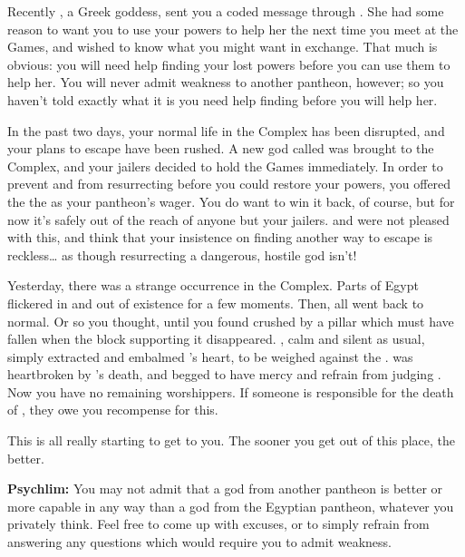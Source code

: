 \documentclass[char]{guardians}
\begin{document}
Recently \cHera{}, a Greek goddess, sent you a coded message through \cJascha{}. She had some reason to want you to use your powers to help her the next time you meet at the Games, and wished to know what you might want in exchange. That much is obvious: you will need help finding your lost powers before you can use them to help her. You will never admit weakness to another pantheon, however; so you haven't told \cHera{} exactly what it is you need help finding before you will help her.

In the past two days, your normal life in the Complex has been disrupted, and your plans to escape have been rushed. A new god called \cUnity{} was brought to the Complex, and your jailers decided to hold the Games immediately. In order to prevent \cIsis{} and \cAnubis{} from resurrecting \cSet{} before you could restore your powers, you offered the \cCaretaker{} the \iNecro{\MYname} as your pantheon's wager. You do want to win it back, of course, but for now it's safely out of the reach of anyone but your jailers. \cIsis{} and \cAnubis{} were not pleased with this, and think that your insistence on finding another way to escape is reckless\ldots{} as though resurrecting a dangerous, hostile god isn't!

Yesterday, there was a strange occurrence in the Complex. Parts of Egypt flickered in and out of existence for a few moments. Then, all went back to normal. Or so you thought, until you found \cEgyptianHuman{} crushed by a pillar which must have fallen when the block supporting it disappeared. \cAnubis{}, calm and silent as usual, simply extracted and embalmed \cEgyptianHuman{}'s heart, to be weighed against the \iFeather{\MYname}. \cIsis{} was heartbroken by \cEgyptianHuman{}'s death, and begged \cAnubis{} to have mercy and refrain from judging \cEgyptianHuman{\them}. Now you have no remaining worshippers. If someone is responsible for the death of \cEgyptianHuman{}, they owe you recompense for this.

This is all really starting to get to you. The sooner you get out of this place, the better.

\begin{itemz}[Notes]
  \item\textbf{Psychlim:} You may not admit that a god from another pantheon is better or more capable in any way than a god from the Egyptian pantheon, whatever you privately think. Feel free to come up with excuses, or to simply refrain from answering any questions which would require you to admit weakness.
\end{itemz}
\end{document}
